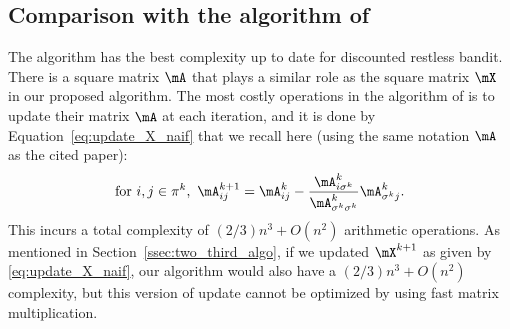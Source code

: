 
\subsection{Comparison with the algorithm of \texorpdfstring{\cite{nino2020fast}}{Nino Mora 2020}}
The algorithm \cite{nino2020fast} has the best complexity up to date for discounted restless bandit. There is a square matrix $\mA$ that plays a similar role as the square matrix $\mX$ in our proposed algorithm. The most costly operations in the algorithm of \cite{nino2020fast} is to update their matrix $\mA$ at each iteration, and it is done by Equation~\eqref{eq:update_X_naif} that we recall here (using the same notation $\mA$ as the cited paper):
\begin{align}
    \label{eq:15}
    \text{for } i,j\in\pi^k,\ \mA^{k+1}_{ij}= \mA^{k}_{ij} -\frac{\mA^{k}_{i\sigma^k}}{\mA^{k}_{\sigma^k\sigma^k}}\mA^{k}_{\sigma^kj}.
\end{align}
This incurs a total complexity of $(2/3)n^3+O(n^2)$ arithmetic operations.
As mentioned in Section~\ref{ssec:two_third_algo}, if we updated $\mX^{k+1}$ as given by \eqref{eq:update_X_naif}, our algorithm would also have a $(2/3)n^3+O(n^2)$ complexity, but this version of update cannot be optimized by using  fast matrix multiplication.


